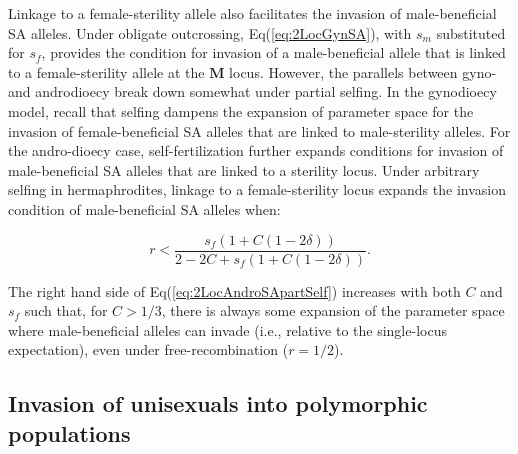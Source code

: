 \documentclass{article}
\begin{document}
Linkage to a female-sterility allele also facilitates the invasion of male-beneficial SA alleles. Under obligate outcrossing, Eq(\ref{eq:2LocGynSA}), with $s_m$ substituted for $s_f$, provides the condition for invasion of a male-beneficial allele that is linked to a female-sterility allele at the $\mathbf{M}$ locus. However, the parallels between gyno- and androdioecy break down somewhat under partial selfing. In the gynodioecy model, recall that selfing dampens the expansion of parameter space for the invasion of female-beneficial SA alleles that are linked to male-sterility alleles. For the andro-dioecy case, self-fertilization further expands conditions for invasion of male-beneficial SA alleles that are linked to a sterility locus. Under arbitrary selfing in hermaphrodites, linkage to a female-sterility locus expands the invasion condition of male-beneficial SA alleles when:

\begin{equation}\label{eq:2LocAndroSApartSelf}
	r < \frac{s_f(1 + C (1 - 2 \delta))}{2 - 2 C + s_f(1 + C (1 - 2 \delta))}.
\end{equation}

\noindent The right hand side of Eq(\ref{eq:2LocAndroSApartSelf}) increases with both $C$ and $s_f$ such that, for $C > 1/3$, there is always some expansion of the parameter space where male-beneficial alleles can invade (i.e., relative to the single-locus expectation), even under free-recombination ($r = 1/2$). 



\subsection*{Invasion of unisexuals into polymorphic populations}
\end{document}

